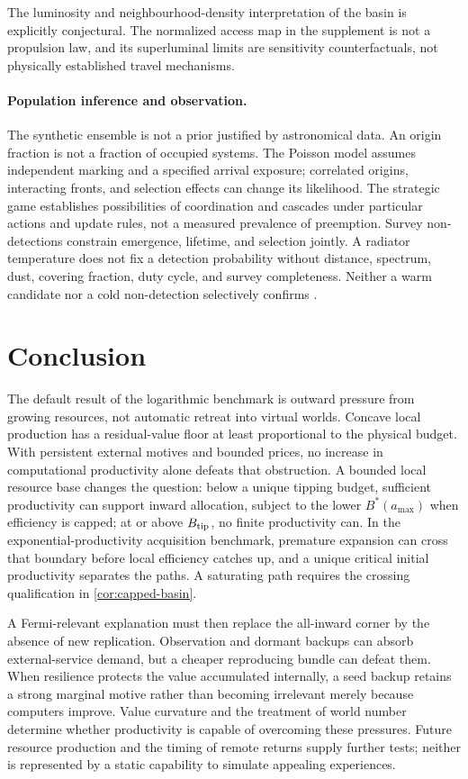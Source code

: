 The luminosity and neighbourhood-density interpretation of the basin is
explicitly conjectural. The normalized access map in the supplement is
not a propulsion law, and its superluminal limits are sensitivity
counterfactuals, not physically established travel mechanisms.

\paragraph{Population inference and observation.}
The synthetic ensemble is not a prior justified by astronomical data.
An origin fraction is not a fraction of occupied systems. The Poisson
model assumes independent marking and a specified arrival exposure;
correlated origins, interacting fronts, and selection effects can change
its likelihood. The strategic game establishes possibilities of
coordination and cascades under particular actions and update rules,
not a measured prevalence of preemption. Survey non-detections constrain
emergence, lifetime, and selection jointly. A radiator temperature does
not fix a detection probability without distance, spectrum, dust,
covering fraction, duty cycle, and survey completeness. Neither a warm
candidate nor a cold non-detection selectively confirms \CITH.

\section{Conclusion}
\label{sec:conclusion}
The default result of the logarithmic benchmark is outward pressure from
growing resources, not automatic retreat into virtual worlds. Concave
local production has a residual-value floor at least proportional to
the physical budget. With persistent external motives and bounded prices,
no increase in computational productivity alone defeats that obstruction.
A bounded local resource base changes the question: below a unique tipping
budget, sufficient productivity can support inward allocation, subject to
the lower $B^*(a_{\max})$ when efficiency is capped; at or above
$B_{\rm tip}$, no finite productivity can. In the exponential-productivity acquisition benchmark,
premature expansion can cross that boundary before local efficiency
catches up, and a unique critical initial productivity separates the paths.
A saturating path requires the crossing qualification in \cref{cor:capped-basin}.

A Fermi-relevant explanation must then replace the all-inward corner by
the absence of new replication. Observation and dormant backups can absorb
external-service demand, but a cheaper reproducing bundle can defeat them.
When resilience protects the value accumulated internally, a seed backup
retains a strong marginal motive rather than becoming irrelevant merely
because computers improve. Value curvature and the treatment of world
number determine whether productivity is capable of overcoming these
pressures. Future resource production and the timing of remote returns
supply further tests; neither is represented by a static capability to
simulate appealing experiences.

